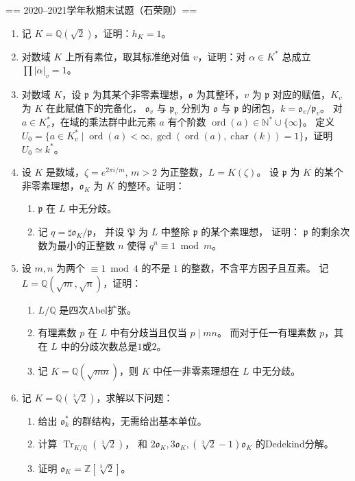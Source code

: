 == 2020--2021学年秋期末试题（石荣刚）==
\begin{enumerate}
    \item 记 $K=\mathbb{Q}(\sqrt{2})$，证明：$h_{K}=1$。
    \item 对数域 $K$ 上所有素位，取其标准绝对值 $v$，证明：对 $\alpha \in K^{*}$ 总成立 $\prod|\alpha|_{v}=1$。
    \item 对数域 $K$，设 $\mathfrak{p}$ 为其某个非零素理想，$\mathfrak{o}$ 为其整环，$v$ 为 $\mathfrak{p}$ 对应的赋值，$K_{v}$ 为 $K$ 在此赋值下的完备化，
    $\mathfrak{o}_{v}$ 与 $\mathfrak{p}_{v}$ 分别为 $\mathfrak{o}$ 与 $\mathfrak{p}$ 的闭包，$k=\mathfrak{o}_{v} / \mathfrak{p}_{v}$。
    对 $a \in K_{v}^{*}$，在域的乘法群中此元素 $a$ 有个阶数 $\operatorname{ord}(a) \in \mathbb{N}^{*} \cup\{\infty\}$。
    定义 $U_{0}=\{a \in K_{v}^{*} \mid \operatorname{ord}(a)<\infty, \operatorname{gcd}(\operatorname{ord}(a), \operatorname{char}(k))=1\}$，证明 $U_{0} \simeq k^{*}$。
    \item 设 $K$ 是数域，$\zeta=e^{2 \pi i / m}$, $m>2$ 为正整数，$L=K(\zeta)$。
    设 $\mathfrak{p}$ 为 $K$ 的某个非零素理想，$\mathfrak{o}_{K}$ 为 $K$ 的整环。证明：
    \begin{enumerate}[label=(\arabic*)]
    \item $\mathfrak{p}$ 在 $L$ 中无分歧。
    \item 记 $q=\sharp \mathfrak{o}_{K} / \mathfrak{p}$，
    并设 $\mathfrak{P}$ 为 $L$ 中整除 $\mathfrak{p}$ 的某个素理想，
    证明： $\mathfrak{p}$ 的剩余次数为最小的正整数 $n$ 使得 $q^{n} \equiv 1 \bmod m$。
    \end{enumerate}
    \item 设 $m, n$ 为两个 $\equiv 1 \bmod 4$ 的不是 $1$ 的整数，不含平方因子且互素。
    记 $L=\mathbb{Q}(\sqrt{m}, \sqrt{n})$，证明：
    \begin{enumerate}[label=(\arabic*)]
    \item $L / \mathbb{Q}$ 是四次Abel扩张。
    \item 有理素数 $p$ 在 $L$ 中有分歧当且仅当 $p \mid mn$。
    而对于任一有理素数 $p$，其在 $L$ 中的分歧次数总是$1$或$2$。
    \item 记 $K=\mathbb{Q}(\sqrt{mn})$，则 $K$ 中任一非零素理想在 $L$ 中无分歧。
    \end{enumerate}
    \item 记 $K=\mathbb{Q}(\sqrt[3]{2})$，求解以下问题：
    \begin{enumerate}[label=(\arabic*)]
    \item 给出 $\mathfrak{o}_{k}^{*}$ 的群结构，无需给出基本单位。
    \item 计算 $\operatorname{Tr}_{K/\mathbb{Q}}(\sqrt[3]{2})$，
    和 $2\mathfrak{o}_{K}, 3\mathfrak{o}_{K}, (\sqrt[3]{2}-1)\mathfrak{o}_{K}$ 的Dedekind分解。
    \item 证明 $\mathfrak{o}_{K}=\mathbb{Z}[\sqrt[3]{2}]$。
    \end{enumerate}
\end{enumerate}